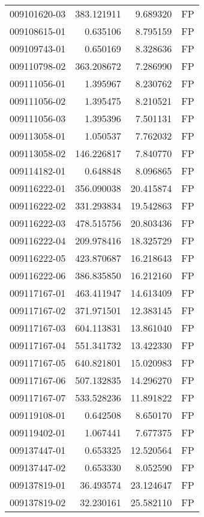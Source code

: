 \begin{tabular}{lrrl}
009101620-03 &  383.121911 &     9.689320 &   FP \\
009108615-01 &    0.635106 &     8.795159 &   FP \\
009109743-01 &    0.650169 &     8.328636 &   FP \\
009110798-02 &  363.208672 &     7.286990 &   FP \\
009111056-01 &    1.395967 &     8.230762 &   FP \\
009111056-02 &    1.395475 &     8.210521 &   FP \\
009111056-03 &    1.395396 &     7.501131 &   FP \\
009113058-01 &    1.050537 &     7.762032 &   FP \\
009113058-02 &  146.226817 &     7.840770 &   FP \\
009114182-01 &    0.648848 &     8.096865 &   FP \\
009116222-01 &  356.090038 &    20.415874 &   FP \\
009116222-02 &  331.293834 &    19.542863 &   FP \\
009116222-03 &  478.515756 &    20.803436 &   FP \\
009116222-04 &  209.978416 &    18.325729 &   FP \\
009116222-05 &  423.870687 &    16.218643 &   FP \\
009116222-06 &  386.835850 &    16.212160 &   FP \\
009117167-01 &  463.411947 &    14.613409 &   FP \\
009117167-02 &  371.971501 &    12.383145 &   FP \\
009117167-03 &  604.113831 &    13.861040 &   FP \\
009117167-04 &  551.341732 &    13.422330 &   FP \\
009117167-05 &  640.821801 &    15.020983 &   FP \\
009117167-06 &  507.132835 &    14.296270 &   FP \\
009117167-07 &  533.528236 &    11.891822 &   FP \\
009119108-01 &    0.642508 &     8.650170 &   FP \\
009119402-01 &    1.067441 &     7.677375 &   FP \\
009137447-01 &    0.653325 &    12.520564 &   FP \\
009137447-02 &    0.653330 &     8.052590 &   FP \\
009137819-01 &   36.493574 &    23.124647 &   FP \\
009137819-02 &   32.230161 &    25.582110 &   FP \\

\end{tabular}
